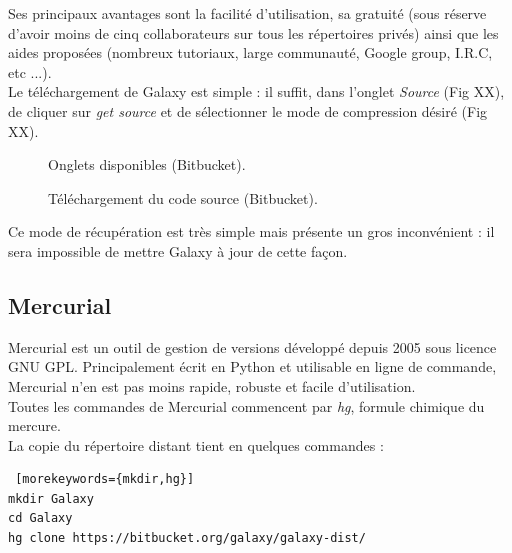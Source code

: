 Ses principaux avantages sont la facilité d'utilisation, sa gratuité (sous réserve d'avoir moins de cinq collaborateurs sur tous les répertoires privés) ainsi que les aides proposées (nombreux tutoriaux, large communauté, Google group, I.R.C, etc ...).\\

Le téléchargement de Galaxy est simple : il suffit, dans l'onglet \textit{Source} (Fig XX), de cliquer sur \textit{get source} et de sélectionner le mode de compression désiré (Fig XX).

\begin{figure}[!h]
 \centering
{}
\caption{Onglets disponibles (Bitbucket).}
\end{figure}
\begin{figure}[!h]
 \centering
{}
\caption{Téléchargement du code source (Bitbucket).}
\end{figure}

Ce mode de récupération est très simple mais présente un gros inconvénient : il sera impossible de mettre Galaxy à jour de cette façon.

\subsection*{Mercurial}

Mercurial est un outil de gestion de versions développé depuis 2005 sous licence GNU GPL. Principalement écrit en Python et utilisable en ligne de commande, Mercurial n'en est pas moins rapide, robuste et facile d'utilisation.\\

Toutes les commandes de Mercurial commencent par \textit{hg}, formule chimique du mercure.\\

La copie du répertoire distant tient en quelques commandes : 
\lstset{language=sh}
\begin{lstlisting} [morekeywords={mkdir,hg}]
mkdir Galaxy
cd Galaxy
hg clone https://bitbucket.org/galaxy/galaxy-dist/
 \end{lstlisting} 

